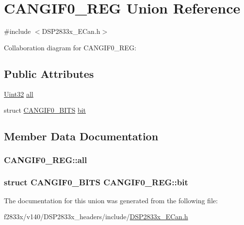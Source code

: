 \hypertarget{union_c_a_n_g_i_f0___r_e_g}{}\section{C\+A\+N\+G\+I\+F0\+\_\+\+R\+E\+G Union Reference}
\label{union_c_a_n_g_i_f0___r_e_g}


{\ttfamily \#include $<$D\+S\+P2833x\+\_\+\+E\+Can.\+h$>$}



Collaboration diagram for C\+A\+N\+G\+I\+F0\+\_\+\+R\+E\+G\+:
\subsection*{Public Attributes}
\begin{DoxyCompactItemize}
\item 
\hyperlink{_d_s_p2833x___device_8h_aba99025e657f892beb7ff31cecf64653}{Uint32} \hyperlink{union_c_a_n_g_i_f0___r_e_g_aaa69660cc1db651cdbe8116785268ea5}{all}
\item 
struct \hyperlink{struct_c_a_n_g_i_f0___b_i_t_s}{C\+A\+N\+G\+I\+F0\+\_\+\+B\+I\+T\+S} \hyperlink{union_c_a_n_g_i_f0___r_e_g_a3b237f02451028e22c93bc48f6597ffd}{bit}
\end{DoxyCompactItemize}


\subsection{Member Data Documentation}
\hypertarget{union_c_a_n_g_i_f0___r_e_g_aaa69660cc1db651cdbe8116785268ea5}{}
\subsubsection[{all}]{ C\+A\+N\+G\+I\+F0\+\_\+\+R\+E\+G\+::all}\label{union_c_a_n_g_i_f0___r_e_g_aaa69660cc1db651cdbe8116785268ea5}
\hypertarget{union_c_a_n_g_i_f0___r_e_g_a3b237f02451028e22c93bc48f6597ffd}{}
\subsubsection[{bit}]{\setlength{\rightskip}{0pt plus 5cm}struct {\bf C\+A\+N\+G\+I\+F0\+\_\+\+B\+I\+T\+S} C\+A\+N\+G\+I\+F0\+\_\+\+R\+E\+G\+::bit}\label{union_c_a_n_g_i_f0___r_e_g_a3b237f02451028e22c93bc48f6597ffd}


The documentation for this union was generated from the following file\+:\begin{DoxyCompactItemize}
\item 
f2833x/v140/\+D\+S\+P2833x\+\_\+headers/include/\hyperlink{_d_s_p2833x___e_can_8h}{D\+S\+P2833x\+\_\+\+E\+Can.\+h}\end{DoxyCompactItemize}
